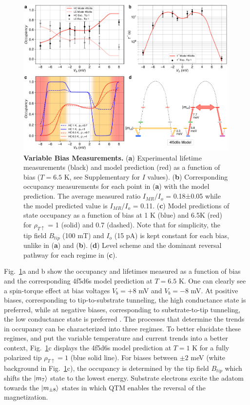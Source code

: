 \documentclass[
reprint,amsmath,amssymb,aps]{revtex4-2}
\begin{document}
\begin{figure}[ht!]
\includegraphics[width=0.99\textwidth]{Fig4_new.pdf}
\caption{\textbf{Variable Bias Measurements.} (\textbf{a}) Experimental lifetime measurements (black) and model prediction (red) as a function of bias ($T = 6.5$ K, see Supplementary for $I$ values). (\textbf{b}) Corresponding occupancy measurements for each point in (\textbf{a}) with the model prediction. The average measured ratio $I_{MR}/I_{o}$ = 0.18±0.05 while the model predicted value is $I_{MR}/I_{o}$ = 0.11. (\textbf{c}) Model predictions of state occupancy as a function of bias at 1 K (blue) and 6.5K (red) for $\rho_{T \uparrow}$ = 1 (solid) and 0.7 (dashed). Note that for simplicity, the tip field $B_{tip}$ (100 mT) and $I_o$ (15 pA) is kept constant for each bias, unlike in (\textbf{a}) and (\textbf{b}). (\textbf{d}) Level scheme and the dominant reversal pathway for each regime in (\textbf{c}).   
\label{fig:bias} }
\end{figure}

Fig.~\ref{fig:bias}a and b show the occupancy and lifetimes measured as a function of bias and the corresponding 4f5d6s model prediction at $T=6.5$ K. One can clearly see a spin-torque effect at bias voltages $V_b=+8 $ mV and $V_b=-8 $ mV. At  positive biases, corresponding to tip-to-substrate tunneling, the high conductance state is preferred, while at negative biases, corresponding to substrate-to-tip tunneling, the low conductance state is preferred \cite{Khajetoorians2013,delgadoSpinTransferTorqueSingle2010,balashovInelasticElectronmagnonInteraction2008,krause_joule_2011}. The processes that determine the trends in occupancy can be characterized into three regimes. To better elucidate these regimes, and put the variable temperature and current trends into a better context, Fig.~\ref{fig:bias}c displays the 4f5d6s model prediction at $T=1$ K for a fully polarized tip $\rho_{T \uparrow} = 1 $ (blue solid line). For biases between $\pm 2$ meV (white background in Fig.~\ref{fig:bias}c), the occupancy is determined by the tip field $B_{tip}$ which shifts the $\ket{m_{7}}$ state to the lowest energy. Substrate electrons excite the adatom towards the $\ket{m_{\pm8}}$ states in which QTM enables the reversal of the magnetization.
\end{document}
